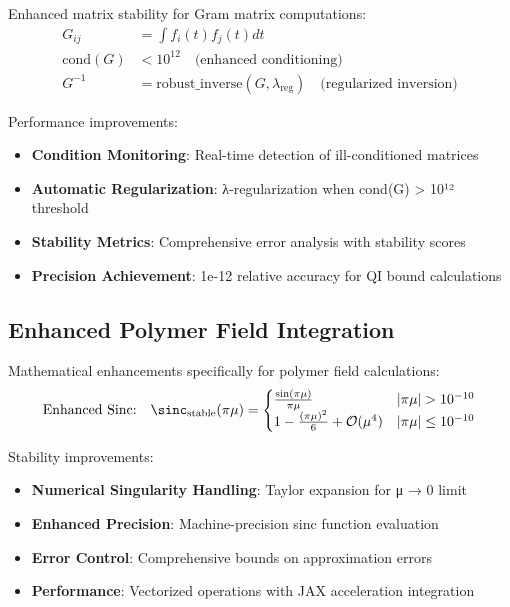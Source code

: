 \documentclass[11pt]{article}
\begin{document}
Enhanced matrix stability for Gram matrix computations:
\begin{align}
G_{ij} &= \int f_i(t) f_j(t) dt \\
\text{cond}(G) &< 10^{12} \quad \text{(enhanced conditioning)} \\
G^{-1} &= \text{robust\_inverse}(G, \lambda_{\text{reg}}) \quad \text{(regularized inversion)}
\end{align}

Performance improvements:
\begin{itemize}
\item \textbf{Condition Monitoring}: Real-time detection of ill-conditioned matrices
\item \textbf{Automatic Regularization}: λ-regularization when cond(G) > 10¹² threshold  
\item \textbf{Stability Metrics}: Comprehensive error analysis with stability scores
\item \textbf{Precision Achievement}: 1e-12 relative accuracy for QI bound calculations
\end{itemize}

\subsection{Enhanced Polymer Field Integration}

Mathematical enhancements specifically for polymer field calculations:
\begin{equation}
\text{Enhanced Sinc:} \quad \sinc_{\text{stable}}(\pi\mu) = \begin{cases}
\frac{\sin(\pi\mu)}{\pi\mu} & |\pi\mu| > 10^{-10} \\
1 - \frac{(\pi\mu)^2}{6} + \mathcal{O}(\mu^4) & |\pi\mu| \leq 10^{-10}
\end{cases}
\end{equation}

Stability improvements:
\begin{itemize}
\item \textbf{Numerical Singularity Handling}: Taylor expansion for μ → 0 limit
\item \textbf{Enhanced Precision}: Machine-precision sinc function evaluation
\item \textbf{Error Control}: Comprehensive bounds on approximation errors
\item \textbf{Performance}: Vectorized operations with JAX acceleration integration
\end{itemize}
\end{document}

